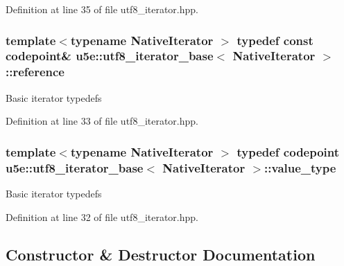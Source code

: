 Definition at line 35 of file utf8\+\_\+iterator.\+hpp.

\subsubsection[{\texorpdfstring{reference}{reference}}]{\setlength{\rightskip}{0pt plus 5cm}template$<$typename Native\+Iterator $>$ typedef const {\bf codepoint}\& {\bf u5e\+::utf8\+\_\+iterator\+\_\+base}$<$ Native\+Iterator $>$\+::{\bf reference}}\hypertarget{classu5e_1_1utf8__iterator__base_a49c75ca98a7c550f584e28e5ea1af883}{}\label{classu5e_1_1utf8__iterator__base_a49c75ca98a7c550f584e28e5ea1af883}
Basic iterator typedefs 

Definition at line 33 of file utf8\+\_\+iterator.\+hpp.

\subsubsection[{\texorpdfstring{value\+\_\+type}{value_type}}]{\setlength{\rightskip}{0pt plus 5cm}template$<$typename Native\+Iterator $>$ typedef {\bf codepoint} {\bf u5e\+::utf8\+\_\+iterator\+\_\+base}$<$ Native\+Iterator $>$\+::{\bf value\+\_\+type}}\hypertarget{classu5e_1_1utf8__iterator__base_a5048b05c23d80befdfdcc5a47b8bcbce}{}\label{classu5e_1_1utf8__iterator__base_a5048b05c23d80befdfdcc5a47b8bcbce}
Basic iterator typedefs 

Definition at line 32 of file utf8\+\_\+iterator.\+hpp.



\subsection{Constructor \& Destructor Documentation}
